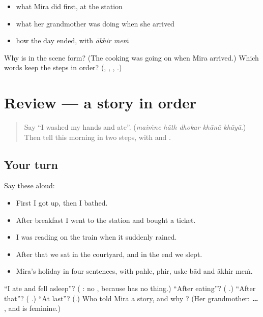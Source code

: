 \begin{itemize}
\raggedright
  \item what Mira did first, at the station
  \item what her grandmother was doing when she arrived
  \item how the day ended, with \emph{ākhir meṁ}
\end{itemize}

\begin{tcolorbox}[breakable,colback=teal!4,colframe=teal!35!black,title={Before you move on}]
Why is \textbf{  } in the scene form? (The cooking was going on when Mira arrived.) Which words keep the steps in order? (\textbf{}, \textbf{}, \textbf{ }, \textbf{ }.)
\end{tcolorbox}
\section[(review)]{Review — a story in order}

\label{lesson:HI-R279-a-story-in-order}



\begin{quote}
Say \textquotedblleft{}I washed my hands and ate\textquotedblright{}. (\emph{maiṁne hāth dhokar khānā khāyā}.) Then tell this morning in two steps, with \textbf{} and \textbf{}.
\end{quote}

\subsection*{Your turn}
Say these aloud:

\begin{itemize}
\raggedright
  \item First I got up, then I bathed.
  \item After breakfast I went to the station and bought a ticket.
  \item I was reading on the train when it suddenly rained.
  \item After that we sat in the courtyard, and in the end we slept.
  \item Mira's holiday in four sentences, with pahle, phir, uske bād and ākhir meṁ.
\end{itemize}

\begin{tcolorbox}[breakable,colback=teal!4,colframe=teal!35!black,title={Before you move on}]
\textquotedblleft{}I ate and fell asleep\textquotedblright{}? (\textbf{    }: no \textbf{}, because \textbf{ } has no thing.) \textquotedblleft{}After eating\textquotedblright{}? (\textbf{   }.) \textquotedblleft{}After that\textquotedblright{}? (\textbf{ }.) \textquotedblleft{}At last\textquotedblright{}? (\textbf{}.) Who told Mira a story, and why \textbf{}? (Her grandmother: \textbf{  …  }, and \textbf{} is feminine.)
\end{tcolorbox}
